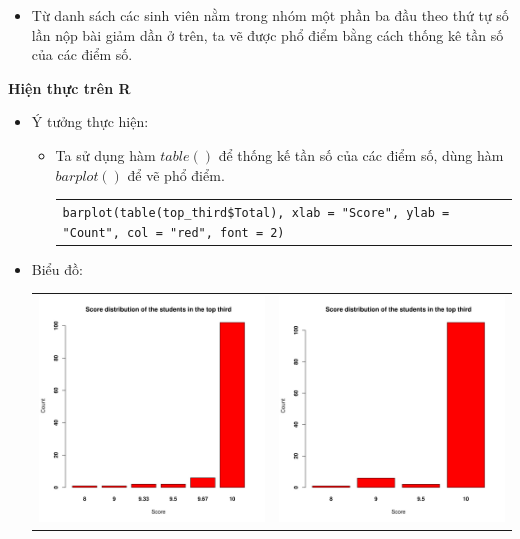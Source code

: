 \documentclass[a4paper]{article}
\theoremstyle{definition}
\begin{document}
\begin{enumerate}[a)]
\begin{itemize}
\begin{itemize}
            \item Từ danh sách các sinh viên nằm trong nhóm một phần ba đầu theo thứ tự số lần nộp bài giảm dần ở trên, ta vẽ được phổ điểm bằng cách thống kê tần số của các điểm số.
        \end{itemize}
    \end{itemize}
    \bf Hiện thực trên R\normalfont
    \begin{itemize}
        \item Ý tưởng thực hiện:
        \begin{itemize}
            \item Ta sử dụng hàm $table()$ để thống kế tần số của các điểm số, dùng hàm $barplot()$ để vẽ phổ điểm.
            \begin{center}
                \begin{tabular}{p{13cm}}
                    \texttt{barplot(table(top\_third\$Total), xlab = "Score", ylab = "Count", col = "red", font = 2)}
                \end{tabular}
            \end{center}
        \end{itemize}
        \item Biểu đồ:\\
        \begin{center}
            \begin{tabular}{c c}
                 \includegraphics[width = 6.9cm]{Images/img3-5-1.png} & \includegraphics[width = 6.9cm]{Images/img3-5-2.png} \\

\end{tabular}
\end{center}
\end{itemize}
\end{enumerate}
\end{document}
